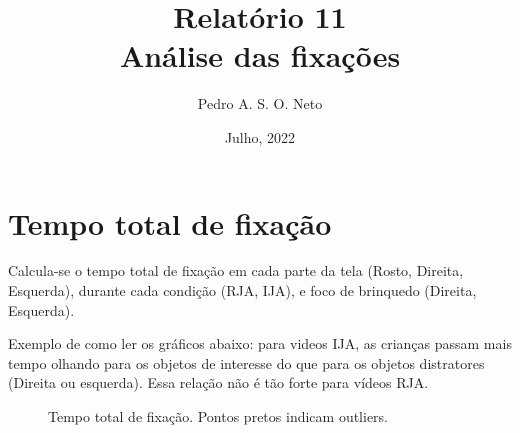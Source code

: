 \documentclass{article}
\title{Relatório 11 \\ Análise das fixações}
\author{Pedro A. S. O. Neto}
\date{Julho, 2022}
\begin{document}
\maketitle

\section{Tempo total de fixação}

Calcula-se o tempo total de fixação em cada parte da tela (Rosto, Direita, Esquerda), durante cada condição (RJA, IJA), e foco de brinquedo (Direita, Esquerda).

Exemplo de como ler os gráficos abaixo: para videos IJA, as crianças passam mais tempo olhando para os objetos de interesse do que para os objetos distratores (Direita ou esquerda). Essa relação não é tão forte para vídeos RJA.

\begin{figure}[]
\caption{Tempo total de fixação. Pontos pretos indicam outliers.}
\noindent{}
\centering
\end{figure}
\end{document}
